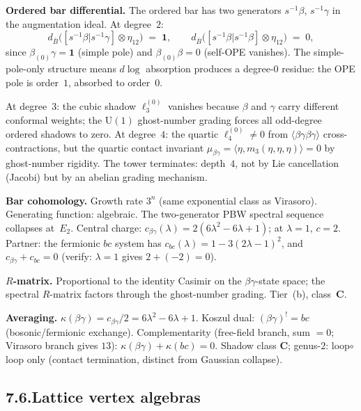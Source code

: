 \documentclass[11pt,reqno]{amsart}
\theoremstyle{definition}
\theoremstyle{remark}
\providecommand{\barB}{\bar{B}}
\numberwithin{equation}{section}
\begin{document}
\medskip\noindent\textbf{Ordered bar differential.}\enspace
The ordered bar has two generators $s^{-1}\beta$, $s^{-1}\gamma$
in the augmentation ideal. At degree~$2$:
\[
d_{\barB}\bigl([s^{-1}\beta|s^{-1}\gamma]\otimes\eta_{12}\bigr)
\;=\;\mathbf{1},
\qquad
d_{\barB}\bigl([s^{-1}\beta|s^{-1}\beta]\otimes\eta_{12}\bigr)
\;=\;0,
\]
since $\beta_{(0)}\gamma=\mathbf{1}$ (simple pole) and
$\beta_{(0)}\beta=0$ (self-OPE vanishes). The simple-pole-only
structure means $d\log$ absorption produces a degree-$0$ residue:
the OPE pole is order~$1$, absorbed to order~$0$.

At degree~$3$: the cubic shadow $\ell_3^{(0)}$ vanishes because
$\beta$ and $\gamma$ carry different conformal weights; the
$\mathrm{U}(1)$ ghost-number grading forces all odd-degree
ordered shadows to zero. At degree~$4$: the quartic
$\ell_4^{(0)}\neq 0$ from $\langle\beta\gamma\beta\gamma\rangle$
cross-contractions, but the quartic contact invariant
$\mu_{\beta\gamma}=\langle\eta,m_3(\eta,\eta,\eta)\rangle=0$
by ghost-number rigidity. The tower terminates: depth~$4$, not
by Lie cancellation (Jacobi) but by an abelian grading mechanism.

\medskip\noindent\textbf{Bar cohomology.}\enspace
Growth rate $3^n$ (same exponential class as Virasoro).
Generating function: algebraic. The two-generator PBW spectral
sequence collapses at~$E_2$. Central charge:
$c_{\beta\gamma}(\lambda)=2(6\lambda^2-6\lambda+1)$; at
$\lambda=1$, $c=2$. Partner: the fermionic $bc$ system has
$c_{bc}(\lambda)=1-3(2\lambda-1)^2$, and $c_{\beta\gamma}+c_{bc}=0$
(verify: $\lambda=1$ gives $2+(-2)=0$).

\medskip\noindent\textbf{$R$-matrix.}\enspace
Proportional to the identity Casimir on the $\beta\gamma$-state
space; the spectral $R$-matrix factors through the ghost-number
grading. Tier~(b), class~$\mathbf{C}$.

\medskip\noindent\textbf{Averaging.}\enspace
$\kappa(\beta\gamma)=c_{\beta\gamma}/2=6\lambda^2-6\lambda+1$.
Koszul dual: $(\beta\gamma)^!=bc$ (bosonic/fermionic exchange).
Complementarity (free-field branch, sum $=0$; Virasoro branch
gives $13$): $\kappa(\beta\gamma)+\kappa(bc)=0$.
Shadow class $\mathbf{C}$; genus-$2$: loop$\circ$loop only
(contact termination, distinct from Gaussian collapse).

\subsection*{7.6.\quad Lattice vertex algebras}
\end{document}
